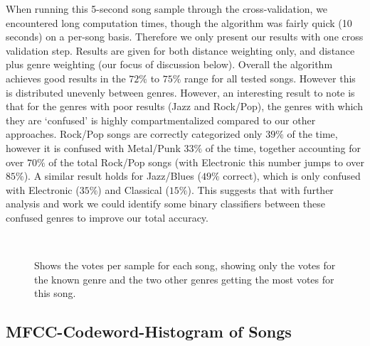 \documentclass[10pt]{article}
\begin{document}
When running this 5-second song sample through the cross-validation, we encountered long computation times, though the algorithm was fairly quick (10 seconds) on a per-song basis.  Therefore we only present our results with one cross validation step.  Results are given for both distance weighting only, and distance plus genre weighting (our focus of discussion below).  Overall the algorithm achieves good results in the $72\%$ to $75\%$ range for all tested songs.  However this is distributed unevenly between genres.  However, an interesting result to note is that for the genres with poor results (Jazz and Rock/Pop), the genres with which they are ‘confused’ is highly compartmentalized compared to our other approaches.  Rock/Pop songs are correctly categorized only $39\%$ of the time, however it is confused with Metal/Punk $33\%$ of the time, together accounting for over $70\%$ of the total Rock/Pop songs (with Electronic this number jumps to over $85\%$).  A similar result holds for Jazz/Blues ($49\%$ correct), which is only confused with Electronic ($35\%$) and Classical ($15\%$).  This suggests that with further analysis and work we could identify some binary classifiers between these confused genres to improve our total accuracy.


\begin{figure}[h!]
\\
\caption{Shows the votes per sample for each song, showing only the votes for the known genre and the two other genres getting the most votes for this song.}
\label{fig:fivesecond_song_votes}
\end{figure}

\pagebreak
\subsection{MFCC-Codeword-Histogram of Songs }
\end{document}
